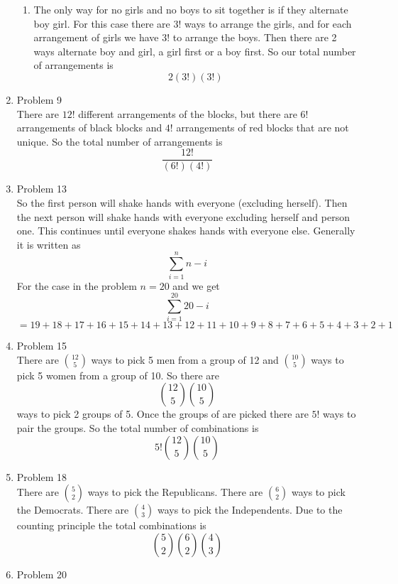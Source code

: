 \documentclass[11pt]{article}
\numberwithin{equation}{section}
\begin{document}
\begin{enumerate}
\begin{enumerate}
\item
The only way for no girls and no boys to sit together is if they alternate boy girl. For this case there are $3!$ ways to arrange the girls, and for each arrangement of girls we have $3!$ to arrange the boys. Then there are 2 ways alternate boy and girl, a girl first or a boy first. So our total number of arrangements is 
$$2(3!)(3!)$$
\begin{center}
\end{center}
\end{enumerate}
\item Problem 9\\
There are $12!$ different arrangements of the blocks, but there are $6!$ arrangements of black blocks and $4!$ arrangements of red blocks that are not unique. So the total number of arrangements is
$$\frac{12!}{(6!)(4!)}$$
\begin{center}
\end{center}
\item Problem 13\\
So the first person will shake hands with everyone (excluding herself). Then the next person will shake hands with everyone excluding herself and person one. This continues until everyone shakes hands with everyone else. Generally it is written as
$$\sum_{i=1}^{n}{n-i}$$
For the case in the problem $n = 20$ and we get
$$\sum_{i=1}^{20}{20-i}$$
$=19+18+17+16+15+14+13+12+11+10+9+8+7+6+5+4+3+2+1 $
\item Problem 15\\
There are $12\choose{5}$ ways to pick 5 men from a group of 12 and $10\choose{5}$ ways to pick 5 women from a group of 10. So there are
$${12\choose{5}} {10\choose{5}}$$
ways to pick 2 groups of 5. Once the groups of are picked there are $5!$ ways to pair the groups. So the total number of combinations is
$$5!{12\choose{5}} {10\choose{5}}$$
\begin{center}
\end{center}
\item Problem 18\\
There are $5\choose{2}$ ways to pick the Republicans. 
There are $6\choose{2}$ ways to pick the Democrats. 
There are $4\choose{3}$ ways to pick the Independents. Due to the counting principle the total combinations is
$${5\choose{2}}{6\choose{2}}{4\choose{3}}$$
\begin{center}
\end{center}
\item Problem 20

\end{enumerate}
\end{document}
